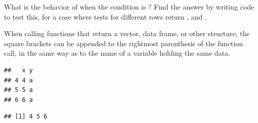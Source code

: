 \documentclass[krantz2]{krantz}\usepackage{knitr}
\begin{document}
\begin{playground}
What is the behavior of  when the condition is ? Find the answer by writing code to test this, for a case where tests for different rows return ,  and .
\end{playground}

When calling functions that return a vector, data frame, or other structure, the square brackets can be appended to the rightmost parenthesis of the function call, in the same way as to the name of a variable holding the same data.

\begin{knitrout}\footnotesize
{}\color{fgcolor}\begin{kframe}
\begin{alltt}
 \hlopt{>} \hlstd{)[ ,} \hlopt{-}\hlstd{]}
\end{alltt}
\begin{verbatim}
##   x y
## 4 4 a
## 5 5 a
## 6 6 a
\end{verbatim}
\begin{alltt}
 \hlopt{>} \hlstd{)}\hlopt{$}
\end{alltt}
\begin{verbatim}
## [1] 4 5 6
\end{verbatim}
\end{kframe}
\end{knitrout}
\end{document}
